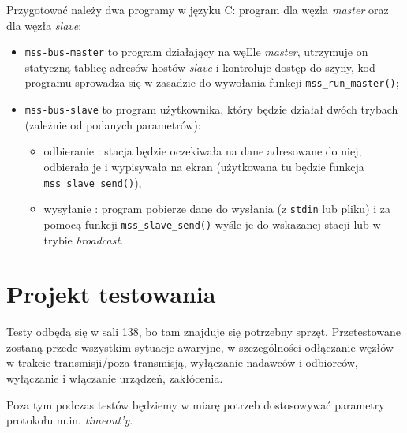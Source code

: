 \documentclass[a4paper,12pt]{article}
\begin{document}
Przygotować należy dwa programy w języku C: program dla węzła \emph{master}
oraz dla węzła \emph{slave}:
\begin{itemize}
    \item \texttt{mss-bus-master} to program działający na węĽle
          \emph{master}, utrzymuje on statyczną tablicę adresów hostów
          \emph{slave} i kontroluje dostęp do szyny, kod programu sprowadza
          się w zasadzie do wywołania funkcji \texttt{mss\_run\_master()};
    \item \texttt{mss-bus-slave} to program użytkownika, który będzie działał
          dwóch trybach (zależnie od podanych parametrów):
          \begin{itemize}
              \item odbieranie : stacja będzie oczekiwała na dane adresowane
              do niej, odbierała je i wypisywała na ekran (użytkowana tu
              będzie funkcja \texttt{mss\_slave\_send()}),
              \item wysyłanie : program pobierze dane do wysłania (z
              \texttt{stdin} lub pliku) i za pomocą funkcji
              \texttt{mss\_slave\_send()} wyśle je do wskazanej stacji lub
              w trybie \emph{broadcast}.
          \end{itemize}
\end{itemize}

\section{Projekt testowania}

Testy odbędą się w sali 138, bo tam znajduje się potrzebny sprzęt.
Przetestowane zostaną przede wszystkim sytuacje awaryjne, w szczególności
odłączanie węzłów w trakcie transmisji/poza transmisją, wyłączanie nadawców
i odbiorców, wyłączanie i włączanie urządzeń, zakłócenia.

Poza tym podczas testów będziemy w miarę potrzeb dostosowywać parametry
protokołu m.in. \emph{timeout'y}.
\end{document}
